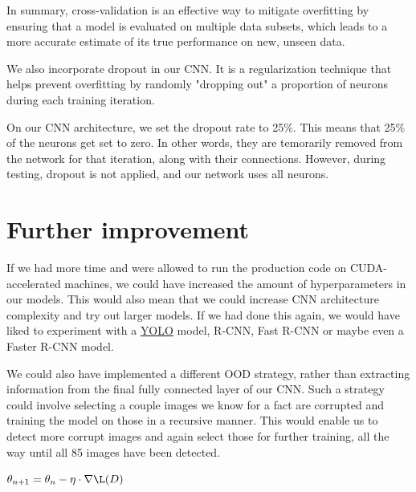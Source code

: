 \documentclass{article}
\begin{document}
In summary, cross-validation is an effective way to mitigate overfitting by ensuring that a model is evaluated on multiple data subsets, which leads to a more accurate estimate of its true performance on new, unseen data.

We also incorporate dropout in our CNN. It is a regularization technique that helps prevent overfitting by randomly "dropping out" a proportion of neurons during each training iteration. 

On our CNN architecture, we set the dropout rate to 25\%. This means that 25\% of the neurons get set to zero. In other words, they are temorarily removed from the network for that iteration, along with their connections. However, during testing, dropout is not applied, and our network uses all neurons.

\section{Further improvement}

If we had more time and were allowed to run the production code on CUDA-accelerated machines, we could have increased the amount of hyperparameters in our models. This would also mean that we could increase CNN architecture complexity and try out larger models. If we had done this again, we would have liked to experiment with a \href{https://arxiv.org/pdf/1506.02640}{YOLO} model, R-CNN, Fast R-CNN or maybe even a Faster R-CNN model.

We could also have implemented a different OOD strategy, rather than extracting information from the final fully connected layer of our CNN. Such a strategy could involve selecting a couple images we know for a fact are corrupted and training the model on those in a recursive manner. This would enable us to detect more corrupt images and again select those for further training, all the way until all 85 images have been detected.

$\theta_{n+1} = \theta_{n} - \eta \cdot \nabla \L(D)$
\end{document}
